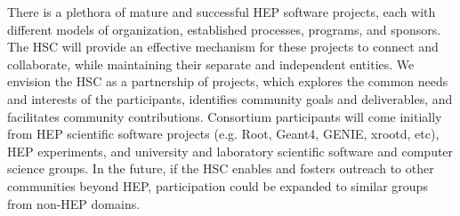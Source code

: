\documentclass[12pt,letterpaper,fleqn]{article}
\begin{document}
There is a plethora of mature and successful HEP software projects,
each with different models of organization, established processes,
programs, and sponsors.  The HSC will provide an effective mechanism
for these projects to connect and collaborate, while maintaining
their separate and independent entities.  We envision the HSC as a
partnership of projects, which explores the common needs and interests
of the participants, identifies community goals and deliverables,
and facilitates community contributions. Consortium participants
will come initially from HEP scientific software projects (e.g.
Root, Geant4, GENIE, xrootd, etc), HEP experiments, and university and
laboratory scientific software and computer science groups.  In the
future, if the HSC enables and fosters outreach to other communities
beyond HEP, participation could be expanded to similar groups from
non-HEP domains.
\end{document}
